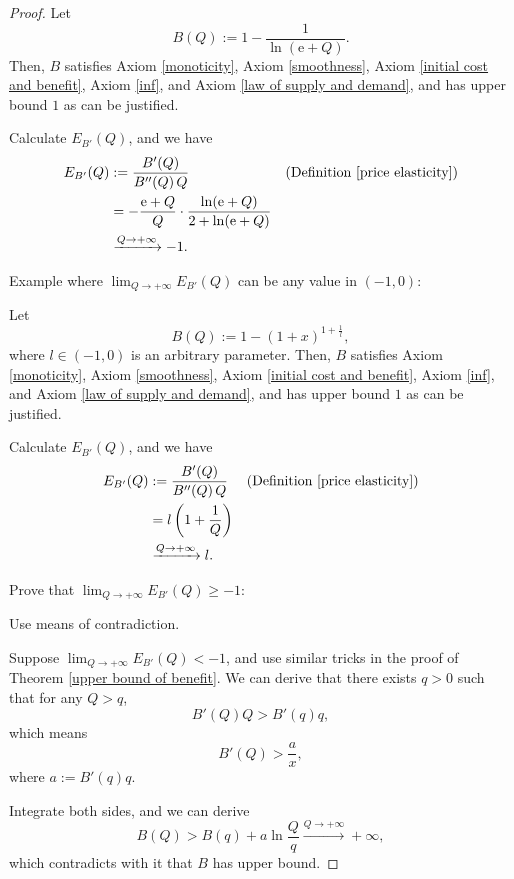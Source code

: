 \documentclass{article}
\begin{document}
\begin{proof}
Let
$$B\!\left(Q\right):=1-\frac1{\ln\!\left(\mathrm e+Q\right)}.$$
Then, $B$ satisfies Axiom \ref{monoticity}, Axiom \ref{smoothness}, Axiom \ref{initial cost and benefit}, Axiom \ref{inf}, and Axiom \ref{law of supply and demand}, and has upper bound $1$ as can be justified.

Calculate $E_{B'}\!\left(Q\right)$, and we have
\begin{align*}
E_{B'}\!\left(Q\right)&:=\frac{B'\!\left(Q\right)}{B''\!\left(Q\right)Q}&&\text{(Definition \ref{price elasticity})}\\
&=-\frac{\mathrm e+Q}Q\cdot\frac{\ln\!\left(\mathrm e+Q\right)}{2+\ln\!\left(\mathrm e+Q\right)}\\
&\xrightarrow{Q\to+\infty}-1.
\end{align*}

Example where $\lim_{Q\to+\infty}E_{B'}\!\left(Q\right)$ can be any value in $\left(-1,0\right)$:

Let
$$B\!\left(Q\right):=1-\left(1+x\right)^{1+\frac1l},$$
where $l\in\left(-1,0\right)$ is an arbitrary parameter.
Then, $B$ satisfies Axiom \ref{monoticity}, Axiom \ref{smoothness}, Axiom \ref{initial cost and benefit}, Axiom \ref{inf}, and Axiom \ref{law of supply and demand}, and has upper bound $1$ as can be justified.

Calculate $E_{B'}\!\left(Q\right)$, and we have
\begin{align*}
E_{B'}\!\left(Q\right)&:=\frac{B'\!\left(Q\right)}{B''\!\left(Q\right)Q}&&\text{(Definition \ref{price elasticity})}\\
&=l\left(1+\frac1Q\right)\\
&\xrightarrow{Q\to+\infty}l.
\end{align*}

Prove that $\lim_{Q\to+\infty}E_{B'}\!\left(Q\right)\ge-1$:

Use means of contradiction.

Suppose $\lim_{Q\to+\infty}E_{B'}\!\left(Q\right)<-1$,
and use similar tricks in the proof of Theorem \ref{upper bound of benefit}.
We can derive that there exists $q>0$ such that for any $Q>q$,
$$B'\!\left(Q\right)Q>B'\!\left(q\right)q,$$
which means
$$B'\!\left(Q\right)>\frac ax,$$
where $a:=B'\!\left(q\right)q$.

Integrate both sides, and we can derive
$$B\!\left(Q\right)>B\!\left(q\right)+a\ln\frac Qq\xrightarrow{Q\to+\infty}+\infty,$$
which contradicts with it that $B$ has upper bound.
\end{proof}
\end{document}
